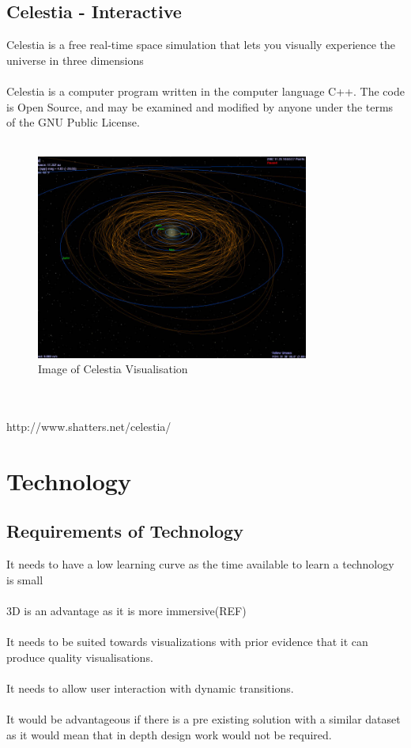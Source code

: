 \documentclass[11pt
              , a4paper
              , twoside
              , openright
              ]{report}
\begin{document}
\section{Celestia - Interactive}
Celestia is a free real-time space simulation that lets you visually experience the universe in three dimensions
\\\\
Celestia is a computer program written in the computer language C++.  The code is Open Source, and may be examined and modified by anyone under the terms of the GNU Public License.
\\\\
\begin{figure}[h!]
  \centering
      \includegraphics[width=0.8\textwidth]{images/celestia.jpg}
  \caption{Image of Celestia Visualisation}
\end{figure}
\\\\
http://www.shatters.net/celestia/
\chapter{Technology}
\section{Requirements of Technology}
It needs to have a low learning curve as the time available to learn a technology is small
\\\\
3D is an advantage as it is more immersive(REF)
\\\\
It needs to be suited towards visualizations with prior evidence that it can produce quality visualisations.
\\\\
It needs to allow user interaction with dynamic transitions.
\\\\
It would be advantageous  if there is a pre existing solution with a similar dataset as it would mean that in depth design work would not be required.
\end{document}

